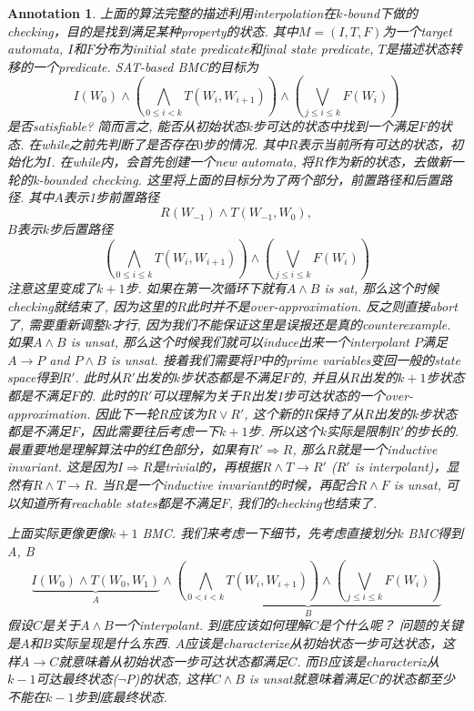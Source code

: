 \documentclass{article}
\newtheorem{annotation}[theorem]{Annotation}
\begin{document}
\begin{annotation}
\rm 上面的算法完整的描述利用interpolation在$k$-bound下做的checking，目的是找到满足某种property的状态. 其中$M=(I,T,F)$为一个target automata, $I$和$F$分布为initial state predicate和final state predicate, $T$是描述状态转移的一个predicate. SAT-based BMC的目标为
\[
    I(W_0) \wedge \left(\bigwedge_{0 \leq i < k} T(W_i, W_{i+1})\right) \wedge \left(\bigvee_{j \leq i \leq k}F(W_i)\right)
\]
是否satisfiable? 简而言之, 能否从初始状态$k$步可达的状态中找到一个满足$F$的状态. 在while之前先判断了是否存在$0$步的情况. 其中$R$表示当前所有可达的状态，初始化为$I$. 在while内，会首先创建一个new automata, 将$R$作为新的状态，去做新一轮的k-bounded checking. 这里将上面的目标分为了两个部分，前置路径和后置路径. 其中$A$表示1步前置路径
\[
    R(W_{-1}) \wedge T(W_{-1}, W_{0}),
\]
$B$表示$k$步后置路径
\[
    \left(\bigwedge_{0 \leq i \leq k} T(W_i, W_{i+1})\right) \wedge \left(\bigvee_{j \leq i \leq k}F(W_i)\right)
\]
注意这里变成了$k+1$步. 如果在第一次循环下就有$A \wedge B$ is sat, 那么这个时候checking就结束了, 因为这里的$R$此时并不是over-approximation. 反之则直接abort了, 需要重新调整$k$才行, 因为我们不能保证这里是误报还是真的counterexample. 如果$A \wedge B$ is unsat, 那么这个时候我们就可以induce出来一个interpolant $P$满足$A \to P$ and $P \wedge B$ is unsat. 接着我们需要将$P$中的prime variables变回一般的state space得到$R'$. 此时从$R'$出发的$k$步状态都是不满足$F$的, 并且从$R$出发的$k+1$步状态都是不满足$F$的. 此时的$R'$可以理解为关于$R$出发1步可达状态的一个over-approximation. 因此下一轮$R$应该为$R \vee R'$, 这个新的$R$保持了从$R$出发的$k$步状态都是不满足$F$，因此需要往后考虑一下$k+1$步. 所以这个$k$实际是限制$R'$的步长的. 最重要地是理解算法中的红色部分，如果有$R' \Rightarrow R$, 那么$R$就是一个inductive invariant. 这是因为$I \Rightarrow R$是trivial的，再根据$R \wedge T \to R'$ ($R'$ is interpolant)，显然有$R \wedge T \to R$. 当$R$是一个inductive invariant的时候，再配合$R \wedge F$ is unsat, 可以知道所有reachable states都是不满足$F$, 我们的checking也结束了.

上面实际更像更像$k+1$ BMC. 我们来考虑一下细节，先考虑直接划分$k$ BMC得到A, B
\[
   \underbrace{I(W_0) \wedge T(W_0, W_1)}_{A} \wedge \underbrace{\left(\bigwedge_{0<i<k} T(W_i, W_{i+1}) \right) \wedge \left(\bigvee_{j \leq i \leq k}F(W_i)\right)}_B
\]
假设$C$是关于$A \wedge B$一个interpolant. 到底应该如何理解$C$是个什么呢？ 问题的关键是$A$和$B$实际呈现是什么东西. $A$应该是characterize从初始状态一步可达状态，这样$A \to C$就意味着从初始状态一步可达状态都满足$C$. 而$B$应该是characteriz从$k-1$可达最终状态($\neg P$)的状态, 这样$C \wedge B$ is unsat就意味着满足$C$的状态都至少不能在$k-1$步到底最终状态. 
\end{annotation}
\end{document}
